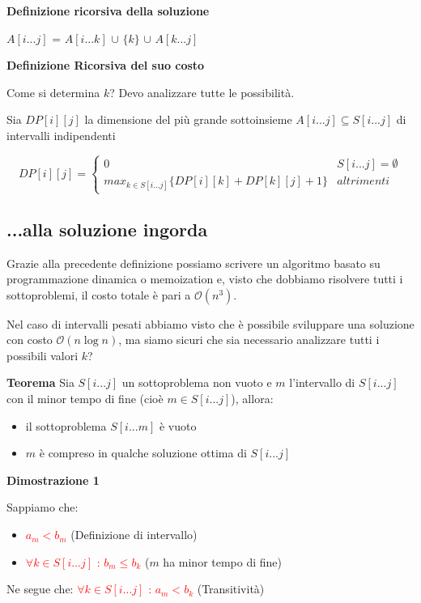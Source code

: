 \documentclass[../cheatSheetAlgoritmi.tex]{subfiles}
\begin{document}
\hfill \break
\textbf{Definizione ricorsiva della soluzione}

$A[i...j]$ = $A[i...k]$ $\cup$ $\{k\}$ $\cup$ $A[k...j]$

\hfill \break
\textbf{Definizione Ricorsiva del suo costo}

Come si determina $k$? Devo analizzare tutte le possibilità.

Sia $DP[i][j]$ la dimensione del più grande sottoinsieme $A[i...j] \subseteq S[i...j]$ di intervalli indipendenti
\begin{center}
	\begin{equation*}
  		DP[i][j]=\begin{cases}
    		0  & \text{$S[i...j] = \emptyset$}\\
    		max_{k \in S[i...j]}\{DP[i][k] + DP[k][j] + 1\} & \text{$altrimenti$}
  		\end{cases}
	\end{equation*}
\end{center}
\subsection{...alla soluzione ingorda}
Grazie alla precedente definizione possiamo scrivere un algoritmo basato su programmazione dinamica o memoization e, visto che dobbiamo risolvere tutti i sottoproblemi, il costo totale è pari a $\mathcal{O}(n^3)$.

Nel caso di intervalli pesati abbiamo visto che è possibile sviluppare una soluzione con costo $\mathcal{O}(n\log{n})$, ma siamo sicuri che sia necessario analizzare tutti i possibili valori $k$?

\bigskip

\textbf{Teorema}
\hfill \break
Sia $S[i...j]$ un sottoproblema non vuoto e $m$ l'intervallo di $S[i ...j]$ con il minor tempo di fine (cioè $m \in S[i...j] $), allora:
\begin{itemize}
	\item il sottoproblema $S[i...m]$ è vuoto
	\item $m$ è compreso in qualche soluzione ottima di $S[i ...j]$
\end{itemize}
 
\begin{flushleft}
\textbf{Dimostrazione 1}
\end{flushleft}
Sappiamo che:
\begin{itemize}
	\item  \textcolor{red}{$a_m < b_m$} (Definizione di intervallo)
	\item \textcolor{red}{$\forall k \in S[i...j]$ : $b_m \leq b_k$} ($m$ ha minor tempo di fine)
\end{itemize}
Ne segue che: \textcolor{red}{$\forall k \in S[i...j]$ : $a_m < b_k$} (Transitività)
\end{document}
